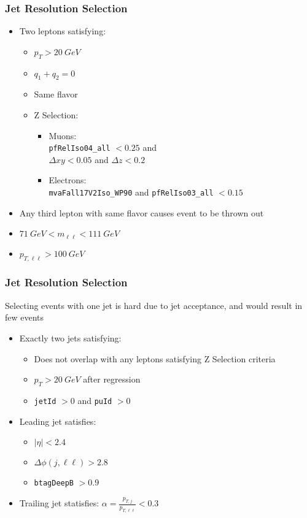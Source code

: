\documentclass{beamer}
\begin{document}
\begin{frame}
  \frametitle{Jet Resolution Selection}

  \begin{itemize}
  \item Two leptons satisfying:
    \begin{itemize}
    \item $p_T > \SI{20}{GeV}$
    \item $q_1 + q_2 = 0$
    \item Same flavor
    \item Z Selection:
      \begin{itemize}
      \item Muons: \\
        \texttt{pfRelIso04\_all} $< 0.25$ and \\
        $\Delta xy < 0.05$ and $\Delta z < 0.2$
      \item Electrons: \\
        \texttt{mvaFall17V2Iso\_WP90} and \texttt{pfRelIso03\_all} $< 0.15$
      \end{itemize}
    \end{itemize}
  \item Any third lepton with same flavor causes event to be thrown out
  \item $\SI{71}{GeV} < m_{\ell\ell} < \SI{111}{GeV}$
  \item $p_{T,\ell\ell} > \SI{100}{GeV}$
  \end{itemize}

\end{frame}


\begin{frame}
  \frametitle{Jet Resolution Selection}

  Selecting events with one jet is hard due to jet acceptance,
  and would result in few events

  \vfill

  \begin{itemize}
  \item Exactly two jets satisfying:
    \begin{itemize}
    \item Does not overlap with any leptons satisfying Z Selection criteria
    \item $p_T > \SI{20}{GeV}$ after regression
    \item \texttt{jetId} $> 0$ and \texttt{puId} $> 0$
    \end{itemize}
  \item Leading jet satisfies:
    \begin{itemize}
    \item $|\eta| < 2.4$
    \item $\Delta\phi(j, \ell\ell) > 2.8$
    \item \texttt{btagDeepB} $> 0.9$
    \end{itemize}
  \item Trailing jet statisfies: $\alpha = \frac{p_{T, j}}{p_{T, \ell\ell}} < 0.3$
  \end{itemize}

\end{frame}
\end{document}
